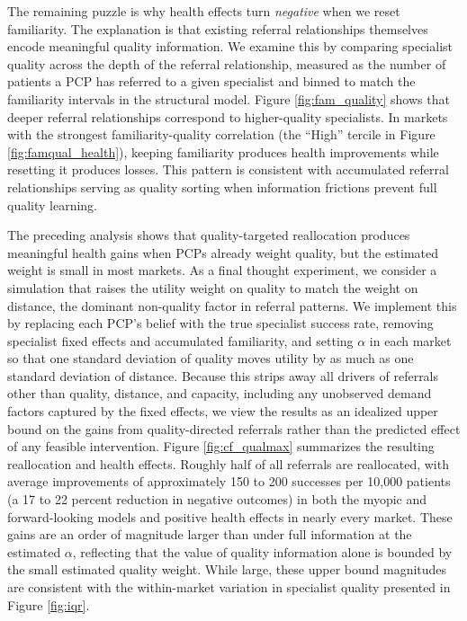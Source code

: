 \documentclass[12pt]{article}
\begin{document}
The remaining puzzle is why health effects turn \emph{negative} when we reset familiarity. The explanation is that existing referral relationships themselves encode meaningful quality information. We examine this by comparing specialist quality across the depth of the referral relationship, measured as the number of patients a PCP has referred to a given specialist and binned to match the familiarity intervals in the structural model. Figure \ref{fig:fam_quality} shows that deeper referral relationships correspond to higher-quality specialists. In markets with the strongest familiarity-quality correlation (the ``High'' tercile in Figure \ref{fig:famqual_health}), keeping familiarity produces health improvements while resetting it produces losses. This pattern is consistent with accumulated referral relationships serving as quality sorting when information frictions prevent full quality learning.

The preceding analysis shows that quality-targeted reallocation produces meaningful health gains when PCPs already weight quality, but the estimated weight is small in most markets. As a final thought experiment, we consider a simulation that raises the utility weight on quality to match the weight on distance, the dominant non-quality factor in referral patterns. We implement this by replacing each PCP's belief with the true specialist success rate, removing specialist fixed effects and accumulated familiarity, and setting $\alpha$ in each market so that one standard deviation of quality moves utility by as much as one standard deviation of distance. Because this strips away all drivers of referrals other than quality, distance, and capacity, including any unobserved demand factors captured by the fixed effects, we view the results as an idealized upper bound on the gains from quality-directed referrals rather than the predicted effect of any feasible intervention. Figure \ref{fig:cf_qualmax} summarizes the resulting reallocation and health effects. Roughly half of all referrals are reallocated, with average improvements of approximately 150 to 200 successes per 10,000 patients (a 17 to 22 percent reduction in negative outcomes) in both the myopic and forward-looking models and positive health effects in nearly every market. These gains are an order of magnitude larger than under full information at the estimated $\alpha$, reflecting that the value of quality information alone is bounded by the small estimated quality weight. While large, these upper bound magnitudes are consistent with the within-market variation in specialist quality presented in Figure \ref{fig:iqr}.
\end{document}

